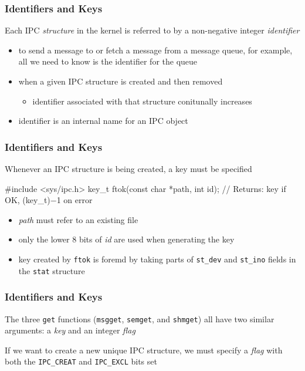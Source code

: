 \documentclass[newPxFont,sthlmFooter,nooffset]{beamer}
\begin{document}
\begin{frame}[t]
  \frametitle{Identifiers and Keys}
Each IPC \textit{structure} in the kernel is referred to by a non-negative integer \textit{identifier}
\begin{itemize}
\item to send a message to or fetch a message from a message queue, for example, all we need to know is the identifier for the queue
\item when a given IPC structure is created and then removed
  \begin{itemize}
  \item identifier associated with that structure conitunally increases
  \end{itemize}
\item identifier is an internal name for an IPC object
\end{itemize}
\end{frame}

\begin{frame}[t, fragile]
  \frametitle{Identifiers and Keys}
Whenever an IPC structure is being created, a key must be specified

\begin{codedef}
#include <sys/ipc.h>
key_t ftok(const char *path, int id);
// Returns: key if OK, (key_t)−1 on error
\end{codedef}

\begin{itemize}
\item \textit{path} must refer to an existing file
\item only the lower 8 bits of \textit{id} are used when generating the key
\item key created by \texttt{ftok} is foremd by taking parts of \texttt{st\_dev} and \texttt{st\_ino} fields in the \texttt{stat} structure
\end{itemize}

\end{frame}


\begin{frame}[t, fragile]
  \frametitle{Identifiers and Keys}
The three \texttt{get} functions (\texttt{msgget}, \texttt{semget}, and \texttt{shmget}) all have two similar arguments: a \textit{key} and an integer \textit{flag}


\bigskip
If we want to create a new unique IPC structure, we must specify a \textit{flag} with both the \texttt{IPC\_CREAT} and \texttt{IPC\_EXCL} bits set
\end{frame}
\end{document}
